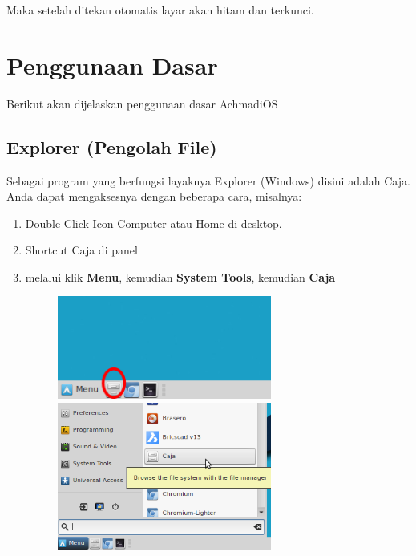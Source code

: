 \documentclass[12pt,]{article}
\begin{document}
	Maka setelah ditekan otomatis layar akan hitam dan terkunci.

	\newpage

	\section{Penggunaan Dasar}

	Berikut akan dijelaskan penggunaan dasar AchmadiOS

	\subsection{Explorer (Pengolah File)}

	Sebagai program yang berfungsi layaknya Explorer (Windows) disini adalah Caja.
	Anda dapat mengaksesnya dengan beberapa cara, misalnya:

	\begin{enumerate}
		\item Double Click Icon Computer atau Home di desktop.
		\item Shortcut Caja di panel
		\item melalui klik \textbf{Menu}, kemudian \textbf{System Tools}, kemudian \textbf{Caja} 
		\begin{figure}[!ht]
			\centering
			\includegraphics[width=200pt]{png/panelcaja}
			\includegraphics[width=200pt]{png/menucaja}
		\end{figure}
	\end{enumerate}
\end{document}
